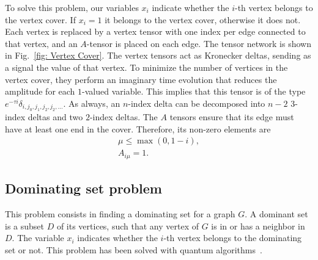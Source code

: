 To solve this problem, our variables $x_i$ indicate whether the $i$-th vertex belongs to the vertex cover. If $x_i=1$ it belongs to the vertex cover, otherwise it does not. Each vertex is replaced by a vertex tensor with one index per edge connected to that vertex, and an $A$-tensor is placed on each edge. The tensor network is shown in Fig.~\ref{fig: Vertex Cover}. The vertex tensors act as Kronecker deltas, sending as a signal the value of that vertex. To minimize the number of vertices in the vertex cover, they perform an imaginary time evolution that reduces the amplitude for each $1$-valued variable. This implies that this tensor is of the type $e^{-\tau i} \delta_{i,j_0,j_1,j_2,j_2,\dots}$. As always, an $n$-index delta can be decomposed into $n-2$ $3$-index deltas and two $2$-index deltas. The $A$ tensors ensure that its edge must have at least one end in the cover. Therefore, its non-zero elements are
\begin{equation}
    \begin{gathered}
        \mu \leq \max(0,1-i),\\
        A_{i\mu} = 1.
    \end{gathered}
\end{equation}



\subsection{Dominating set problem}
This problem consists in finding a dominating set for a graph $G$. A dominant set is a subset $D$ of its vertices, such that any vertex of $G$ is in or has a neighbor in $D$. The variable $x_i$ indicates whether the $i$-th vertex belongs to the dominating set or not. This problem has been solved with quantum algorithms~\cite{Dominant_Grover,Dominant_Set_Quantum}.

